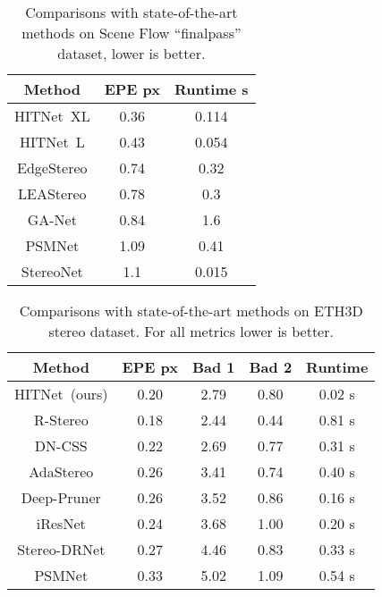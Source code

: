 \documentclass[final]{cvpr}
\newcommand{\algoname}{HITNet}
\begin{document}
\begin{table}[ht]
\begin{center}
\begin{tabular}{|c|c|c|}
\hline
 Method & EPE px & Runtime s \\
\hline
\algoname \ XL & 0.36 & 0.114 \\
\algoname \ L & 0.43 & 0.054 \\ 
EdgeStereo \cite{song2020edgestereo} & 0.74 & 0.32 \\
LEAStereo \cite{cheng2020hierarchical} & 0.78 & 0.3 \\
GA-Net \cite{Zhang2019GANet} & 0.84 & 1.6 \\
PSMNet \cite{chang2018pyramid} & 1.09 & 0.41 \\
StereoNet \cite{stereonet} & 1.1 & 0.015 \\ 
\hline
\end{tabular}
\caption{Comparisons with state-of-the-art methods on Scene Flow ``finalpass'' dataset, lower is better.}
\label{tab:sceneflow}
\end{center}
\vspace{-20pt}
\end{table}

\begin{table}[ht]
\begin{center}
\begin{tabular}{|c|c|c|c|c|}
\hline
 \small{Method} & \small{EPE px} & \small{Bad 1} & \small{Bad 2} & \small{Runtime}\\
\hline
    \small{ \algoname \ (ours)} & 0.20 & 2.79 & 0.80 & 0.02 s\\
    \small{R-Stereo} & 0.18 & 2.44 & 0.44 & 0.81 s\\ 
    \small{DN-CSS} & 0.22 & 2.69 & 0.77 & 0.31 s\\ 
    \small{AdaStereo} \cite{song2020adastereo} & 0.26 & 3.41 & 0.74 & 0.40 s\\
    \small{Deep-Pruner} \cite{duggal2019deeppruner} & 0.26 & 3.52 & 0.86 & 0.16 s\\
    \small{iResNet} \cite{liang2017learning} & 0.24 & 3.68 & 1.00 & 0.20 s\\
    \small{Stereo-DRNet} \cite{chabra2019stereodrnet} & 0.27 & 4.46 & 0.83 & 0.33 s\\
    \small{PSMNet} \cite{chang2018pyramid} & 0.33 & 5.02 & 1.09 & 0.54 s\\
\hline
\end{tabular}
\caption{Comparisons with state-of-the-art methods on ETH3D stereo dataset. For all metrics lower is better.}
\label{tab:eth3d}
\end{center}
\vspace{-15pt}
\end{table}
\end{document}
